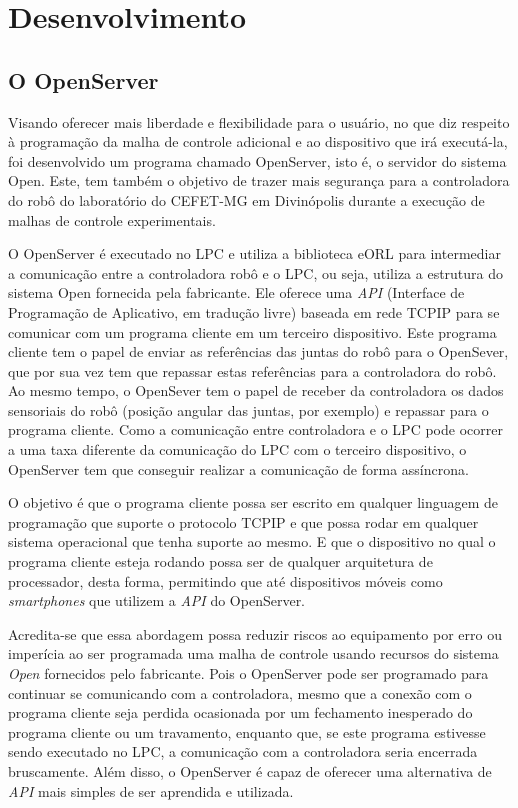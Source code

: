 \chapter{Desenvolvimento}%
    \label{chp:Desenvolvimento}
	
	\section{O OpenServer}
	
    	Visando oferecer mais liberdade e flexibilidade para o usuário, no que diz respeito à programação da malha de controle adicional e ao dispositivo que irá executá-la, foi desenvolvido um programa chamado OpenServer, isto é, o servidor do sistema Open. Este, tem também o objetivo de trazer mais segurança para a controladora do robô do laboratório do CEFET-MG em Divinópolis durante a execução de malhas de controle experimentais. 
    	
    	O OpenServer é executado no LPC e utiliza a biblioteca \ac{eORL} para intermediar a comunicação entre a controladora robô e o LPC, ou seja, utiliza a estrutura do sistema Open fornecida pela fabricante. Ele oferece uma \textit{API} (Interface de Programação de Aplicativo, em tradução livre) baseada em rede \ac{TCPIP} para se comunicar com um programa cliente em um terceiro dispositivo. Este programa cliente tem o papel de enviar as referências das juntas do robô para o OpenSever, que por sua vez tem que repassar estas referências para a controladora do robô. Ao mesmo tempo, o OpenSever tem o papel de receber da controladora os dados sensoriais do robô (posição angular das juntas, por exemplo) e repassar para o programa cliente. Como a comunicação entre controladora e o LPC pode ocorrer a uma taxa diferente da comunicação do LPC com o terceiro dispositivo, o OpenServer tem que conseguir realizar a comunicação de forma assíncrona. 
    	
    	O objetivo é que o programa cliente possa ser escrito em qualquer linguagem de programação que suporte o protocolo \ac{TCPIP} e que possa rodar em qualquer sistema operacional que tenha suporte ao mesmo. E que o dispositivo no qual o programa cliente esteja rodando possa ser de qualquer arquitetura de processador, desta forma, permitindo que até dispositivos móveis como \textit{smartphones} que utilizem a \textit{API} do OpenServer.
        
        Acredita-se que essa abordagem possa reduzir riscos ao equipamento por erro ou imperícia ao ser programada uma malha de controle usando recursos do sistema \textit{Open} fornecidos pelo fabricante. Pois o OpenServer pode ser programado para continuar se comunicando com a controladora, mesmo que a conexão com o programa cliente seja perdida ocasionada por um fechamento inesperado do programa cliente ou um travamento, enquanto que, se este programa estivesse sendo executado no LPC, a comunicação com a controladora seria encerrada bruscamente. Além disso, o OpenServer é capaz de oferecer uma alternativa de \textit{API} mais simples de ser aprendida e utilizada.
	
